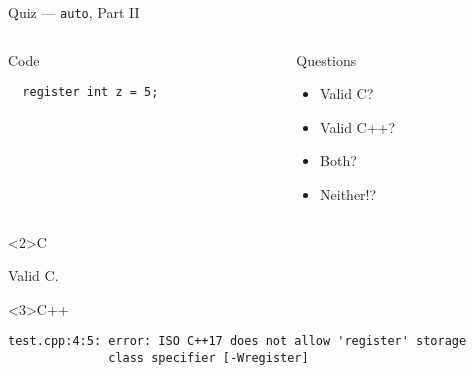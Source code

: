 \documentclass[presentation,aspectratio=169]{beamer}
\begin{document}
\begin{frame}[fragile,label={sec:org23c4234}]{Quiz — \texttt{auto}, Part II}
 \begin{columns}
\begin{column}{0.48\columnwidth}
\begin{block}{Code}
\begin{verbatim}
  register int z = 5;
\end{verbatim}
\end{block}
\end{column}

\begin{column}{0.48\columnwidth}
\begin{block}{Questions}
\begin{itemize}
\item Valid C?
\item Valid C++?
\item Both?
\item Neither!?
\end{itemize}
\end{block}
\end{column}
\end{columns}

\begin{block}<2>{C}

Valid C.

\end{block}
\vspace{-1cm}
\begin{block}<3>{C++}
\begin{verbatim}
test.cpp:4:5: error: ISO C++17 does not allow 'register' storage
              class specifier [-Wregister]
\end{verbatim}
\end{block}
\end{frame}

\end{document}
